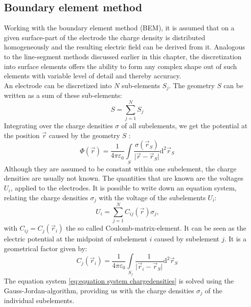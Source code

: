 	\subsection{Boundary element method}
	  Working with the boundary element method (BEM), it is assumed that on a given surface-part of the electrode the charge density is distributed homogeneously and the resulting electric field can be derived from it. Analogous to the line-segment methods discussed earlier in this chapter, the discretization into surface elements offers the ability to form any complex shape out of such elements with variable level of detail and thereby accuracy.\\
	  An electrode can be discretized into $N$ sub-elements $S_j$. The geometry $S$ can be written as a sum of these sub-elements:
	\begin{equation}
		S = \sum_{j=1}^{N} S_j
		\label{eq:sum over geometry}
	\end{equation}
	  Integrating over the charge densities $\sigma$ of all subelements, we get the potential at the position $\vec{r}$ caused by the geometry $S$ \cite{electronoptics}:
	  \begin{equation}
	    \Phi(\vec{r}) = \frac{1}{4\pi\varepsilon_0}\int\limits_{S}\frac{\sigma(\vec{r}_{S})}{\vert\vec{r}-\vec{r}_{S}\vert}\mathrm{d}^{2}\vec{r}_{S}
	    \label{eq:potential in point r}
	  \end{equation}
	  Although they are assumed to be constant within one subelement, the charge densities are usually not known. The quantities that are known are the voltages $U_i$, applied to the electrodes. It is possible to write down an equation system, relating the charge densities $\sigma_j$ with the voltage of the subelements $U_i$:
	  \begin{equation}
		U_{i} = \sum_{j=1}^{N} C_{ij}(\vec{r})\sigma_{j}\text{,}
		\label{eq:equation system chargedensities}
	  \end{equation}
	  with $C_{ij}=C_{j}(\vec{r}_i)$ the so called Coulomb-matrix-element. It can be seen as the electric potential at the midpoint of subelement $i$ caused by subelement $j$. It  is a geometrical factor given by:
	  \begin{equation}
		C_{j}(\vec{r}_{i}) = \frac{1}{4\pi\varepsilon_0}\int\limits_{S_j}\frac{1}{\vert\vec{r}_{i}-\vec{r}_{S}\vert}\mathrm{d}^{2}\vec{r}_{S}
		\label{eq:coulomb matrix element}
	  \end{equation}
	  The equation system \eqref{eq:equation system chargedensities} is solved using the Gauss-Jordan-algorithm, providing us with the charge densities $\sigma_j$ of the individual subelements.\\ 
	  

